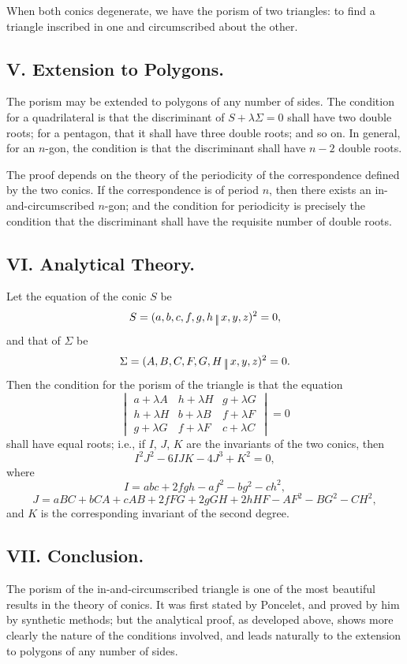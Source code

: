 \documentclass[11pt,a4paper]{book}
\begin{document}
When both conics degenerate, we have the porism of two triangles: to find a triangle inscribed in one and circumscribed about the other.

\subsection*{V. Extension to Polygons.}

The porism may be extended to polygons of any number of sides. The condition for a quadrilateral is that the discriminant of $S+\lambda\Sigma=0$ shall have two double roots; for a pentagon, that it shall have three double roots; and so on. In general, for an $n$-gon, the condition is that the discriminant shall have $n-2$ double roots.

The proof depends on the theory of the periodicity of the correspondence defined by the two conics. If the correspondence is of period $n$, then there exists an in-and-circumscribed $n$-gon; and the condition for periodicity is precisely the condition that the discriminant shall have the requisite number of double roots.

\subsection*{VI. Analytical Theory.}

Let the equation of the conic $S$ be
\[
S = (a,b,c,f,g,h\,\raisebox{-0.5ex}{\text{\textbardbl}}\,x,y,z)^2 = 0,
\]
and that of $\Sigma$ be
\[
\Sigma = (A,B,C,F,G,H\,\raisebox{-0.5ex}{\text{\textbardbl}}\,x,y,z)^2 = 0.
\]
Then the condition for the porism of the triangle is that the equation
\[
\begin{vmatrix}
a+\lambda A & h+\lambda H & g+\lambda G \\
h+\lambda H & b+\lambda B & f+\lambda F \\
g+\lambda G & f+\lambda F & c+\lambda C
\end{vmatrix} = 0
\]
shall have equal roots; i.e., if $I$, $J$, $K$ are the invariants of the two conics, then
\[
I^2J^2 - 6IJK - 4J^3 + K^2 = 0,
\]
where
\[
I = abc + 2fgh - af^2 - bg^2 - ch^2,
\]
\[
J = aBC + bCA + cAB + 2fFG + 2gGH + 2hHF - AF^2 - BG^2 - CH^2,
\]
and $K$ is the corresponding invariant of the second degree.

\subsection*{VII. Conclusion.}

The porism of the in-and-circumscribed triangle is one of the most beautiful results in the theory of conics. It was first stated by Poncelet, and proved by him by synthetic methods; but the analytical proof, as developed above, shows more clearly the nature of the conditions involved, and leads naturally to the extension to polygons of any number of sides.
\end{document}
